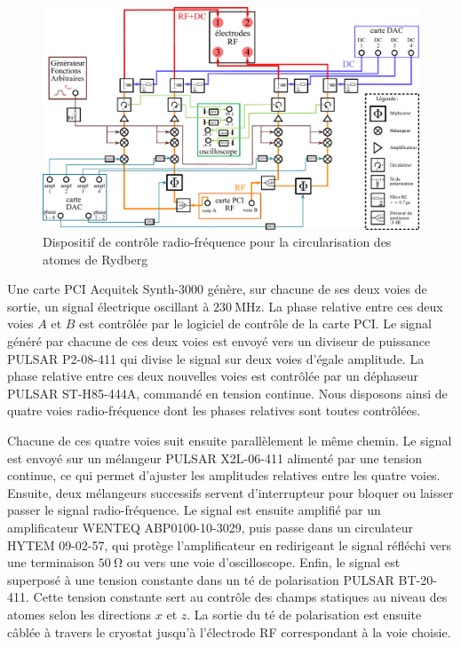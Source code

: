 \begin{figure}
\centering
\includegraphics[width=\linewidth]{figures/circulars/RF_control}
\caption[Dispositif de contrôle radio-fréquence]
{Dispositif de contrôle radio-fréquence pour la circularisation des atomes de Rydberg}
\label{fig:RF_control}
\end{figure}

Une carte PCI Acquitek Synth-3000 génère, sur chacune de ses deux voies de sortie, un signal électrique oscillant à $\SI{230}{\MHz}$.
La phase relative entre ces deux voies $A$ et $B$ est contrôlée par le logiciel de contrôle de la carte PCI.
Le signal généré par chacune de ces deux voies est envoyé vers un diviseur de puissance PULSAR P2-08-411 qui divise le signal sur deux voies d'égale amplitude.
La phase relative entre ces deux nouvelles voies est contrôlée par un déphaseur PULSAR ST-H85-444A, commandé en tension continue.
Nous disposons ainsi de quatre voies radio-fréquence dont les phases relatives sont toutes contrôlées.

Chacune de ces quatre voies suit ensuite parallèlement le même chemin.
Le signal est envoyé sur un mélangeur PULSAR X2L-06-411 alimenté par une tension continue, ce qui permet d'ajuster les amplitudes relatives entre les quatre voies.
Ensuite, deux mélangeurs successifs servent d'interrupteur pour bloquer ou laisser passer le signal radio-fréquence.
Le signal est ensuite amplifié par un amplificateur WENTEQ ABP0100-10-3029, puis passe dans un circulateur HYTEM 09-02-57, qui protège l'amplificateur en redirigeant le signal réfléchi vers une terminaison $\SI{50}{\ohm}$ ou vers une voie d'oscilloscope.
Enfin, le signal est superposé à une tension constante dans un té de polarisation PULSAR BT-20-411.
Cette tension constante sert au contrôle des champs statiques au niveau des atomes selon les directions $x$ et $z$.
La sortie du té de polarisation est ensuite câblée à travers le cryostat jusqu'à l'électrode RF correspondant à la voie choisie.

